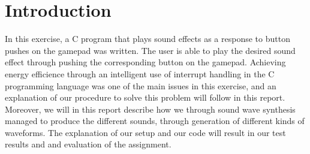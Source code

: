 \section{Introduction}

In this exercise, a C program that plays sound effects as a response to button pushes on the gamepad was written. 
The user is able to play the desired sound effect through pushing the corresponding button on the gamepad.
Achieving energy efficience through an intelligent use of interrupt handling in the C programming language was one of the main issues in this exercise, and an explanation of our procedure to solve this problem will follow in this report.
Moreover, we will in this report describe how we through sound wave synthesis managed to produce the different sounds, through generation of different kinds of waveforms.
The explanation of our setup and our code will result in our test results and and evaluation of the assignment.
